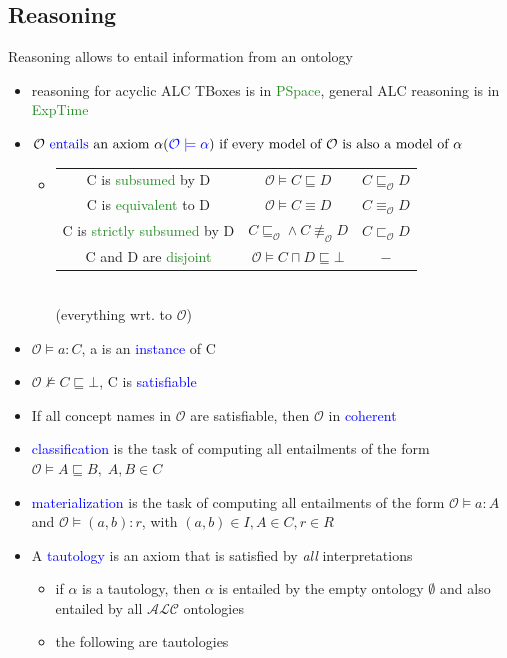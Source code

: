 \documentclass[12pt,a4paper]{article}
\newcommand{\blue}[1]{\textcolor{blue} {#1}}
\newcommand{\green}[1]{\textcolor{ForestGreen} {#1}}
\newcommand{\ont}{\mathcal{O}}
\newcommand{\sse}{\sqsubseteq}
\newcommand{\sand}{\sqcap}
\begin{document}
\subsection{Reasoning}
Reasoning allows to entail information from an ontology
\begin{itemize}
\item reasoning for acyclic ALC TBoxes is in \green{PSpace}, general ALC reasoning is in \green{ExpTime}
\item $\mathcal{O} \text{ \blue{entails} an axiom } \alpha(\blue{\mathcal{O \models \alpha}}) \text{ if every model of } \mathcal{O} \text{ is also a model of }\alpha$
\begin{itemize}
\item \begin{tabular}{c c c}
C is \green{subsumed} by D & $\mathcal{O} \models C \sse D$ & $C\sse_\mathcal{O}D$\\
C is \green{equivalent} to D & $\mathcal{O} \models C \equiv D$ & $C\equiv_\mathcal{O}D$\\
C is \green{strictly subsumed} by D & $C \sse_\mathcal{O} \land C \not\equiv_\mathcal{O} D$ & $C\sqsubset_\mathcal{O}D$\\
C and D are \green{disjoint} & $\mathcal{O} \models C \sand D \sse \bot$ & $-$
\end{tabular}\\
\centering
(everything wrt. to $\mathcal{O}$)
\end{itemize}
\item $\mathcal{O} \models a:C$, a is an \blue{instance} of C
\item $\ont \not\models C \sse \bot$, C is \blue{satisfiable}
\item If all concept names in $\ont$ are satisfiable, then $\ont$ in \blue{coherent}
\item \blue{classification} is the task of computing all entailments of the form $\ont \models A \sse B,\; A,B\in C$
\item \blue{materialization} is the task of computing all entailments of the form $\ont \models a:A$ and $\ont \models (a,b):r$, with $(a,b)\in I, A\in C, r\in R$
\item A \blue{tautology} is an axiom that is satisfied by \textit{all} interpretations
\begin{itemize}
\item if $\alpha$ is a tautology, then $\alpha$ is entailed by the empty ontology $\emptyset$ and also entailed by all $\mathcal{ALC}$ ontologies
\item the following are tautologies\\

\end{itemize}
\end{itemize}
\end{document}
